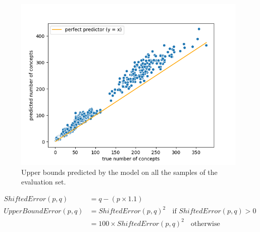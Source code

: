\begin{figure}
    \centering
    \includegraphics[keepaspectratio, width=.9\textwidth]{Figures/Ch3/concept_upper_bound.png}
    \caption{Upper bounds predicted by the model on all the samples of the evaluation set.}
    \label{fig:concept-upper-bound}
\end{figure}

\begin{equation}
    \begin{split}
        ShiftedError(p, q) &= q - (p \times 1.1)\\
        UpperBoundError(p, q) &= ShiftedError(p, q)^2 \;\text{~~if } ShiftedError(p, q) > 0\\
        &= 100 \times ShiftedError(p, q)^2 \;\text{~~otherwise}
        \label{equ:upper-bound-loss}
    \end{split}
\end{equation}